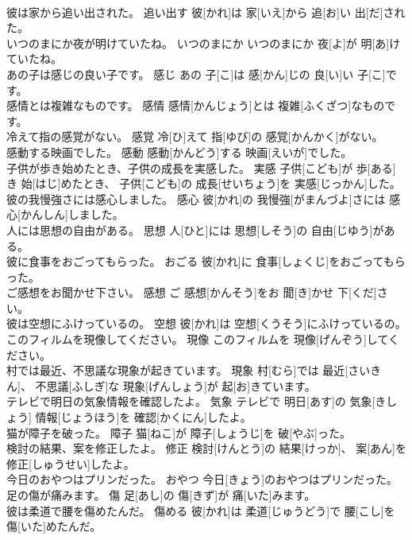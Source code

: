 \documentclass[8pt]{extreport}
\begin{document}
\begin{CJK}{UTF8}{min}
\\	彼は家から追い出された。	追い出す	彼[かれ]は 家[いえ]から 追[お]い 出[だ]された。	
\\	いつのまにか夜が明けていたね。	いつのまにか	いつのまにか 夜[よ]が 明[あ]けていたね。	
\\	あの子は感じの良い子です。	感じ	あの 子[こ]は 感[かん]じの 良[い]い 子[こ]です。	
\\	感情とは複雑なものです。	感情	感情[かんじょう]とは 複雑[ふくざつ]なものです。	
\\	冷えて指の感覚がない。	感覚	冷[ひ]えて 指[ゆび]の 感覚[かんかく]がない。	
\\	感動する映画でした。	感動	感動[かんどう]する 映画[えいが]でした。	
\\	子供が歩き始めたとき、子供の成長を実感した。	実感	子供[こども]が 歩[ある]き 始[はじ]めたとき、 子供[こども]の 成長[せいちょう]を 実感[じっかん]した。	
\\	彼の我慢強さには感心しました。	感心	彼[かれ]の 我慢強[がまんづよ]さには 感心[かんしん]しました。	
\\	人には思想の自由がある。	思想	人[ひと]には 思想[しそう]の 自由[じゆう]がある。	
\\	彼に食事をおごってもらった。	おごる	彼[かれ]に 食事[しょくじ]をおごってもらった。	
\\	ご感想をお聞かせ下さい。	感想	ご 感想[かんそう]をお 聞[き]かせ 下[くだ]さい。	
\\	彼は空想にふけっているの。	空想	彼[かれ]は 空想[くうそう]にふけっているの。	
\\	このフィルムを現像してください。	現像	このフィルムを 現像[げんぞう]してください。	
\\	村では最近、不思議な現象が起きています。	現象	村[むら]では 最近[さいきん]、 不思議[ふしぎ]な 現象[げんしょう]が 起[お]きています。	
\\	テレビで明日の気象情報を確認したよ。	気象	テレビで 明日[あす]の 気象[きしょう] 情報[じょうほう]を 確認[かくにん]したよ。	
\\	猫が障子を破った。	障子	猫[ねこ]が 障子[しょうじ]を 破[やぶ]った。	
\\	検討の結果、案を修正したよ。	修正	検討[けんとう]の 結果[けっか]、 案[あん]を 修正[しゅうせい]したよ。	
\\	今日のおやつはプリンだった。	おやつ	今日[きょう]のおやつはプリンだった。	
\\	足の傷が痛みます。	傷	足[あし]の 傷[きず]が 痛[いた]みます。	
\\	彼は柔道で腰を傷めたんだ。	傷める	彼[かれ]は 柔道[じゅうどう]で 腰[こし]を 傷[いた]めたんだ。	

\end{CJK}
\end{document}
